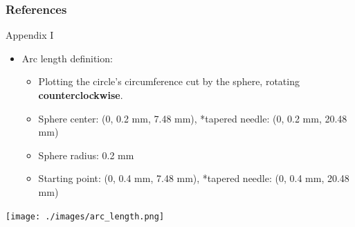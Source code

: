 \AtNextBibliography{\scriptsize}
\begin{frame}%
    \frametitle{References}
    \printbibliography
\end{frame}





\begin{frame}{Appendix I}
\begin{itemize}
    \item Arc length definition:
    \begin{itemize}
        \item Plotting the circle's circumference cut by the sphere, rotating \textbf{counterclockwise}.
        \item Sphere center: (0, 0.2 mm, 7.48 mm), *tapered needle: (0, 0.2 mm, 20.48 mm)
        \item Sphere radius: 0.2 mm
        \item Starting point: (0, 0.4 mm, 7.48 mm), *tapered needle: (0, 0.4 mm, 20.48 mm)
    \end{itemize}
\end{itemize}
\vspace{1mm}
\centering
\texttt{[image: ./images/arc\_length.png]}
\end{frame}


